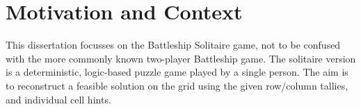 %



\section{Motivation and Context}\label{sec:motivation}

This dissertation focusses on the Battleship Solitaire game, not to be confused with the more commonly known two-player Battleship game. The solitaire version is a deterministic, logic-based puzzle game played by a single person. The aim is to reconstruct a feasible solution on the grid using the given row/column tallies, and individual cell hints.

